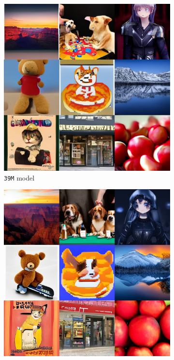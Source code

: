 \begin{figure}[!t]
    \centering
    \begin{subfigure}[b]{0.32\textwidth}
    \centering
    \includegraphics[width=\textwidth]{cp2/figures/t2i/c64.jpg}
    \caption{\texttt{39M} model}
    \end{subfigure}
    \begin{subfigure}[b]{0.32\textwidth}
    \centering
    \includegraphics[width=\textwidth]{cp2/figures/t2i/c96.jpg}

\end{subfigure}
\end{figure}
